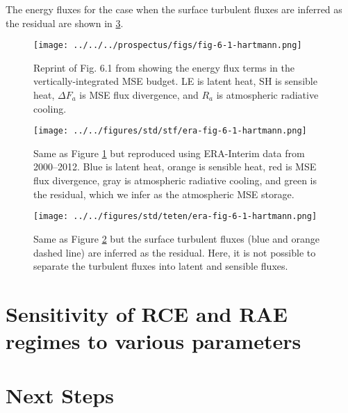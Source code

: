 \documentclass[11pt]{article}
\begin{document}
The energy fluxes for the case when the surface turbulent fluxes are inferred as the residual are shown in \ref{fig:orgf6c4291}.

\begin{figure}[htbp]
\centering
\texttt{[image: ../../../prospectus/figs/fig-6-1-hartmann.png]}
\caption{\label{fig:orge6224e3}Reprint of Fig. 6.1 from \cite{hartmann_global_2016} showing the energy flux terms in the vertically-integrated MSE budget. LE is latent heat, SH is sensible heat, \(\Delta F_a\) is MSE flux divergence, and \(R_a\) is atmospheric radiative cooling.}
\end{figure}

\begin{figure}[htbp]
\centering
\texttt{[image: ../../figures/std/stf/era-fig-6-1-hartmann.png]}
\caption{\label{fig:org4d617c6}Same as Figure \ref{fig:orge6224e3} but reproduced using ERA-Interim data from 2000--2012. Blue is latent heat, orange is sensible heat, red is MSE flux divergence, gray is atmospheric radiative cooling, and green is the residual, which we infer as the atmospheric MSE storage.}
\end{figure}

\begin{figure}[htbp]
\centering
\texttt{[image: ../../figures/std/teten/era-fig-6-1-hartmann.png]}
\caption{\label{fig:orgf6c4291}Same as Figure \ref{fig:org4d617c6} but the surface turbulent fluxes (blue and orange dashed line) are inferred as the residual. Here, it is not possible to separate the turbulent fluxes into latent and sensible fluxes.}
\end{figure}

\section{Sensitivity of RCE and RAE regimes to various parameters}
\label{sec:org5cf4ee6}

\section{Next Steps}
\label{sec:org738ca58}



\end{document}
